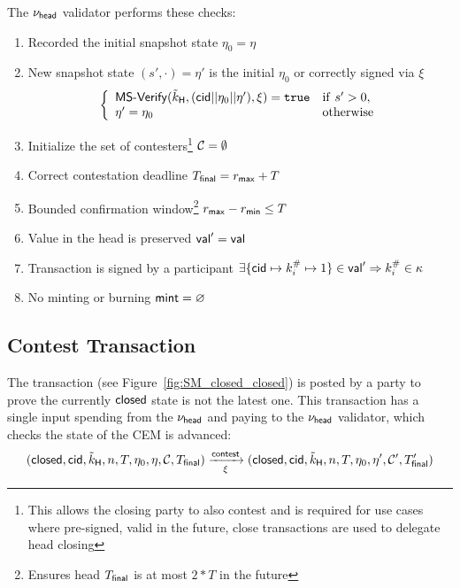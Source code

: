 \noindent The $\nu_\mathsf{head}$ validator performs these checks:
\begin{enumerate}
  \item Recorded the initial snapshot state $\eta_0 = \eta$
  \item New snapshot state $(s', \cdot) = \eta'$ is the initial $\eta_{0}$
        or correctly signed via $\xi$ \\
        \[
          \left\{\begin{array}{ll}
                  \mathsf{MS\textsf{-}{}Verify}(\tilde{k}_{\mathsf{H}},(\mathsf{cid} || \eta_{0} || \eta'),\xi) = \mathtt{true} & \mathrm{if} ~ s' > 0, \\
                  \eta' = \eta_{0} & \mathrm{otherwise}
                 \end{array}\right.
        \]
  \item Initialize the set of contesters\footnote{This allows the closing party
        to also contest and is required for use cases where pre-signed, valid in
        the future, close transactions are used to delegate head closing}
        $\mathcal{C} = \emptyset$
  \item Correct contestation deadline $T_{\mathsf{final}} = r_{\mathsf{max}} + T$
  \item Bounded confirmation window\footnote{Ensures head $T_{\mathsf{final}}$ is at most
        $2*T$ in the future} $r_{\mathsf{max}} - r_{\mathsf{min}} \leq T$
  \item Value in the head is preserved $\mathsf{val}' = \mathsf{val}$
  \item Transaction is signed by a participant $\exists \{\mathsf{cid} \mapsto k^{\#}_{i} \mapsto 1\} \in \mathsf{val}' \Rightarrow k^{\#}_{i} \in \kappa$
  \item No minting or burning $\mathsf{mint} = \varnothing$
\end{enumerate}

\subsection{Contest Transaction}\label{sec:contest-tx}



The \mtxContest{} transaction (see Figure~\ref{fig:SM_closed_closed}) is posted
by a party to prove the currently $\mathsf{closed}$ state is not the latest one. This
transaction has a single input spending from the $\nu_\mathsf{head}$ and paying to the
$\nu_\mathsf{head}$ validator, which checks the state of the CEM is advanced:
\[
  (\mathsf{closed},\mathsf{cid},\tilde{k}_{\mathsf{H}},n,T,\eta_0,\eta,\mathcal{C},T_{\mathsf{final}}) \xrightarrow[\xi]{\mathsf{contest}} (\mathsf{closed},\mathsf{cid},\tilde{k}_{\mathsf{H}},n,T,\eta_0,\eta',\mathcal{C}',T_{\mathsf{final}}')
\]

